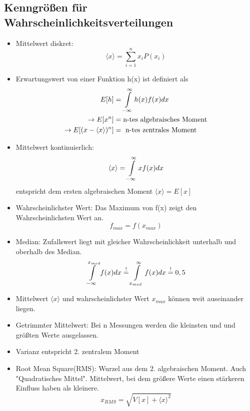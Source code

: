 \documentclass[10pt,a4paper]{article}
\begin{document}
\subsection{Kenngrößen für Wahrscheinlichkeitsverteilungen}
\begin{itemize}
\item Mittelwert diskret: 
\begin{equation}
\langle x \rangle =\sum^{n}_{i=1}x_i P(x_i)
\end{equation}
\item Erwartungswert von einer Funktion h(x) ist definiert als
\begin{align}
E[h]&=\int^{\infty}_{-\infty}\limits {h(x) f(x) dx} \\
\rightarrow E[x^n]&= \text{n-tes algebraisches Moment} \\
\rightarrow E[(x- \langle x \rangle)^n]&= \text{ n-tes zentrales Moment}
\end{align}
\item Mittelwert kontinuierlich:
\begin{equation}
\langle x \rangle= \int^{\infty}_{-\infty}\limits {x f(x) dx} 
\end{equation}
entspricht dem ersten algebraischen Moment $\langle x \rangle=E[x]$
\item Wahrscheinlichster Wert: Das Maximum von f(x) zeigt den Wahrscheinlichsten Wert an.
\begin{equation}
f_{max}=f(x_{max})
\end{equation}
\item Median: Zufallswert liegt mit gleicher Wahrscheinlichkeit unterhalb und oberhalb des Median.
\begin{equation}
\int^{x_{med}}_{-\infty}\limits {f(x) dx} \stackrel{!}{=} \int^{\infty}_{x_{med}}\limits {f(x) dx}\stackrel{!}{=}0,5 
\end{equation}
\item Mittelwert $\langle x \rangle$ und wahrscheinlichster Wert $x_{max}$ können weit auseinander liegen.
\item Getrimmter Mittelwert: Bei n Messungen werden die kleinsten und und größten Werte ausgelassen. 
\item Varianz entspricht 2. zentralem Moment
\item Root Mean Square(RMS): Wurzel aus dem 2. algebraischen Moment. Auch "Quadratisches Mittel". Mittelwert, bei dem größere Werte einen stärkeren Einfluss haben als kleinere.
\begin{equation}
x_{RMS}=\sqrt{V[x]+\langle x \rangle^2}
\end{equation} 


\end{itemize}
\end{document}
